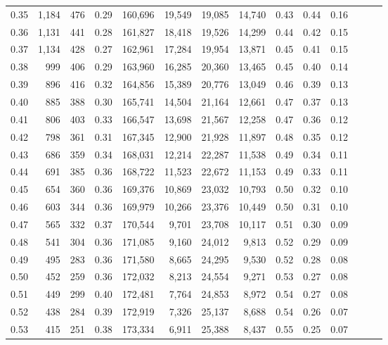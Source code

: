 \begin{tabular}{rrrrrrrrrrrrrr}
0.35 &   1,184 &  476 &  0.29 &  160,696 &   19,549 &  19,085 &  14,740 &  0.43 &  0.44 &      0.16 \\
0.36 &   1,131 &  441 &  0.28 &  161,827 &   18,418 &  19,526 &  14,299 &  0.44 &  0.42 &      0.15 \\
0.37 &   1,134 &  428 &  0.27 &  162,961 &   17,284 &  19,954 &  13,871 &  0.45 &  0.41 &      0.15 \\
0.38 &     999 &  406 &  0.29 &  163,960 &   16,285 &  20,360 &  13,465 &  0.45 &  0.40 &      0.14 \\
0.39 &     896 &  416 &  0.32 &  164,856 &   15,389 &  20,776 &  13,049 &  0.46 &  0.39 &      0.13 \\
0.40 &     885 &  388 &  0.30 &  165,741 &   14,504 &  21,164 &  12,661 &  0.47 &  0.37 &      0.13 \\
0.41 &     806 &  403 &  0.33 &  166,547 &   13,698 &  21,567 &  12,258 &  0.47 &  0.36 &      0.12 \\
0.42 &     798 &  361 &  0.31 &  167,345 &   12,900 &  21,928 &  11,897 &  0.48 &  0.35 &      0.12 \\
0.43 &     686 &  359 &  0.34 &  168,031 &   12,214 &  22,287 &  11,538 &  0.49 &  0.34 &      0.11 \\
0.44 &     691 &  385 &  0.36 &  168,722 &   11,523 &  22,672 &  11,153 &  0.49 &  0.33 &      0.11 \\
0.45 &     654 &  360 &  0.36 &  169,376 &   10,869 &  23,032 &  10,793 &  0.50 &  0.32 &      0.10 \\
0.46 &     603 &  344 &  0.36 &  169,979 &   10,266 &  23,376 &  10,449 &  0.50 &  0.31 &      0.10 \\
0.47 &     565 &  332 &  0.37 &  170,544 &    9,701 &  23,708 &  10,117 &  0.51 &  0.30 &      0.09 \\
0.48 &     541 &  304 &  0.36 &  171,085 &    9,160 &  24,012 &   9,813 &  0.52 &  0.29 &      0.09 \\
0.49 &     495 &  283 &  0.36 &  171,580 &    8,665 &  24,295 &   9,530 &  0.52 &  0.28 &      0.08 \\
0.50 &     452 &  259 &  0.36 &  172,032 &    8,213 &  24,554 &   9,271 &  0.53 &  0.27 &      0.08 \\
0.51 &     449 &  299 &  0.40 &  172,481 &    7,764 &  24,853 &   8,972 &  0.54 &  0.27 &      0.08 \\
0.52 &     438 &  284 &  0.39 &  172,919 &    7,326 &  25,137 &   8,688 &  0.54 &  0.26 &      0.07 \\
0.53 &     415 &  251 &  0.38 &  173,334 &    6,911 &  25,388 &   8,437 &  0.55 &  0.25 &      0.07 \\

\end{tabular}

